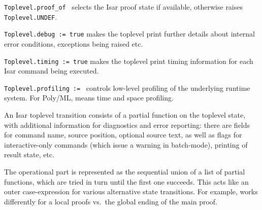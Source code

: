 \begin{isabellebody}
\begin{isamarkuptext}
\begin{description}
  \item \verb|Toplevel.proof_of|~ selects the Isar proof
  state if available, otherwise raises \verb|Toplevel.UNDEF|.

  \item \verb|Toplevel.debug := true| makes the toplevel print further
  details about internal error conditions, exceptions being raised
  etc.

  \item \verb|Toplevel.timing := true| makes the toplevel print timing
  information for each Isar command being executed.

  \item \verb|Toplevel.profiling|~\verb|:=|~ controls
  low-level profiling of the underlying {\ML} runtime system.  For
  Poly/ML,  means time and  space
  profiling.

  \end{description}%
\end{isamarkuptext}%
\isamarkuptrue%
%
\endisatagmlref
{\isafoldmlref}%
%
\isadelimmlref
%
\endisadelimmlref
%
\isamarkuptrue%
%
\begin{isamarkuptext}%
An Isar toplevel transition consists of a partial function on the
  toplevel state, with additional information for diagnostics and
  error reporting: there are fields for command name, source position,
  optional source text, as well as flags for interactive-only commands
  (which issue a warning in batch-mode), printing of result state,
  etc.

  The operational part is represented as the sequential union of a
  list of partial functions, which are tried in turn until the first
  one succeeds.  This acts like an outer case-expression for various
  alternative state transitions.  For example,  works
  differently for a local proofs vs.\ the global ending of the main
  proof.


\end{isamarkuptext}
\end{isabellebody}
